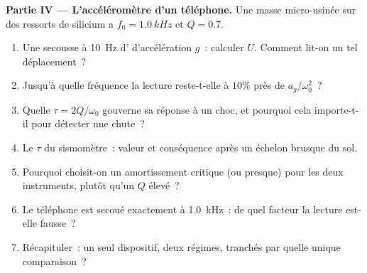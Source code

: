 \begin{problem}
\medskip
\noindent\textbf{Partie IV --- L'accéléromètre d'un téléphone.}
Une masse micro-usinée sur des ressorts de silicium a
$f_0 = \qty{1.0}{kHz}$ et $Q = 0.7$.
\begin{enumerate}[resume]
  \item Une secousse à \qty{10}{Hz} d' d'accélération $g$~:
        calculer $U$. Comment lit-on un tel déplacement~?
  \item Jusqu'à quelle fréquence la lecture reste-t-elle à $10\%$ près de
        $a_g/\omega_0^2$~?
  \item Quelle  $\tau = 2Q/\omega_0$ gouverne sa réponse
        à un choc, et pourquoi cela importe-t-il pour détecter une chute~?
  \item Le $\tau$ du sismomètre~: valeur et conséquence après un échelon
        brusque du sol.
  \item Pourquoi choisit-on un amortissement critique (ou presque) pour
        les deux instruments, plutôt qu'un $Q$ élevé~?
  \item Le téléphone est secoué exactement à \qty{1.0}{kHz}~: de quel
        facteur la lecture est-elle fausse~?
  \item Récapituler~: un seul dispositif, deux régimes, tranchés par
        quelle unique comparaison~?
\end{enumerate}
\end{problem}
